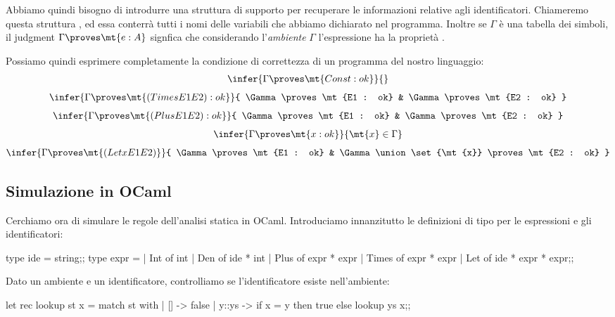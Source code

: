 Abbiamo quindi bisogno di introdurre una struttura di supporto per recuperare le informazioni relative agli identificatori. Chiameremo questa struttura , ed essa conterrà tutti i nomi delle variabili che abbiamo dichiarato nel programma. Inoltre se $\Gamma$ è una tabella dei simboli, il judgment $\Gamma \proves \mt{e : A}$ signfica che considerando l'\emph{ambiente} $\Gamma$ l'espressione  ha la proprietà .

Possiamo quindi esprimere completamente la condizione di correttezza di un programma del nostro linguaggio:
\begin{gather*}
    \infer{\Gamma \proves \mt{Const : ok}}{} 
    \\[4pt]
    \infer{
        \Gamma \proves \mt{(Times E1 E2) : ok}
    }{
        \Gamma \proves \mt{E1 : ok} & 
        \Gamma \proves \mt{E2 : ok}
    } 
    \\[4pt]
    \infer{
        \Gamma \proves \mt{(Plus E1 E2) : ok}
    }{
        \Gamma \proves \mt{E1 : ok} & 
        \Gamma \proves \mt{E2 : ok}
    } \\[4pt]
    \infer{
        \Gamma \proves \mt{x : ok}
    }{
        \mt{x} \in \Gamma
    }
    \\[4pt]
    \infer{
        \Gamma \proves \mt{(Let x E1 E2)}
    }{
        \Gamma \proves \mt{E1 : ok} & \Gamma \union \set{\mt{x}} \proves \mt{E2 : ok}
    }
\end{gather*}

\subsection*{Simulazione in OCaml}

Cerchiamo ora di simulare le regole dell'analisi statica in OCaml. Introduciamo innanzitutto le definizioni di tipo per le espressioni e gli identificatori:
\begin{OCaml}
    type ide = string;;
    type expr = 
        | Int   of int
        | Den   of ide * int
        | Plus  of expr * expr
        | Times of expr * expr
        | Let   of ide * expr * expr;;
\end{OCaml}

Dato un ambiente e un identificatore, controlliamo se l'identificatore esiste nell'ambiente:
\begin{OCaml}
    let rec lookup st x =
        match st with
        | []    -> false
        | y::ys -> if x = y then true
                            else lookup ys x;;
\end{OCaml}

